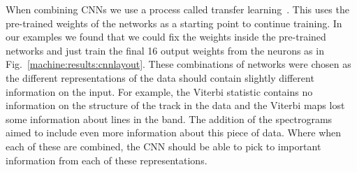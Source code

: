When combining \acp{CNN} we use a process called transfer
learning~\cite{prattDiscriminabilityBasedTransfer}. This uses the pre-trained weights of the networks as a starting point to continue training. 
In our examples we found that we could fix the weights inside the pre-trained networks and just train the final 16 output weights from the neurons as in Fig.~\ref{machine:results:cnnlayout}.
These combinations of networks were chosen as the different representations of the data should contain slightly different information on the input.
For example, the Viterbi statistic contains no information on the structure of the track in the data and the Viterbi maps lost some information about lines in the band.
The addition of the spectrograms aimed to include even more information about this piece of data. 
Where when each of these are combined, the \ac{CNN} should be able to pick to important information from each of these representations.

